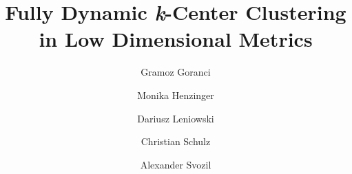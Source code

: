\documentclass[preprint,11pt]{elsarticle}
\title{Fully Dynamic \textit{k}-Center Clustering in Low Dimensional Metrics}
\author[toronto]{Gramoz Goranci\corref{cor1}}
\author[vienna]{Monika Henzinger}
\author[vienna]{Dariusz Leniowski}
\author[heidelberg]{Christian Schulz}
\author[vienna]{Alexander Svozil}
\begin{document}
\begin{abstract}

\end{abstract}

\maketitle










   


    

  






\end{document}
